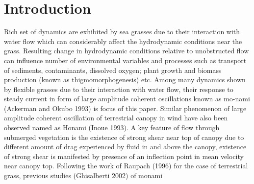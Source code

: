 \documentclass[aps,preprint,floatfix,prl]{revtex4-1}
\begin{document}
\section{Introduction}
Rich set of dynamics are exhibited by sea grasses due to their interaction with water flow which can considerably affect the hydrodynamic conditions near the 
grass. Resulting change in hydrodynamic conditions relative to unobstructed flow can influence number of environmental 
variables and processes such as transport of sediments, contaminants, dissolved oxygen;
plant growth and biomass production (known as thigmomorphogenesis) etc. 
Among many dynamics shown by flexible grasses due to their interaction with water flow, their response to steady current in form of large amplitude coherent oscillations known as
mo-nami (Ackerman and Okubo 1993) is focus of this paper. Similar phenomenon of large amplitude coherent oscillation of terrestrial canopy in wind have also been observed named as Honami 
(Inoue 1993).
\newline
A key feature of flow through submerged vegetation is the existence of strong shear near top of canopy due to
different amount of drag experienced by fluid in and above the canopy, existence of strong shear is manifested by
presence of an inflection point in mean velocity near canopy top.
Following the work of Raupach (1996) for the case of terrestrial grass, previous studies (Ghisalberti 2002) of monami 
\end{document}

